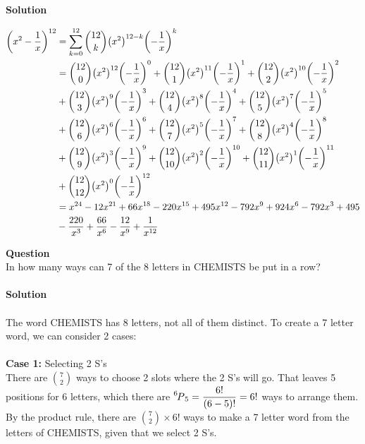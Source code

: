 \documentclass[article, 11pt]{article}
\newcounter{question}
\def\questionnum{{\Large\bfseries{Question \arabic{question} }}\\[1em]}
\newcommand{\question}{
    \stepcounter{question}
    \questionnum
}
\newcommand{\solution}{
    {{\large\bfseries{Solution}}}
}
\DeclarePairedDelimiter\paren{(}{)} %
\newcommand{\df}{\displaystyle\frac} %
\newcommand\perm[2][^n]{\prescript{#1\mkern-2.5mu}{}P_{#2}}
\begin{document}
\solution
\begin{align*}
    \paren*{x^2 - \frac{1}{x}}^{12} &= \sum_{k=0}^{12}\binom{12}{k}\paren*{x^2}^{12-k}\paren*{-\frac{1}{x}}^{k} \\
                                    &=\binom{12}{0}\paren*{x^2}^{12}\paren*{-\frac{1}{x}}^{0}+\binom{12}{1}\paren*{x^2}^{11}\paren*{-\frac{1}{x}}^{1}+\binom{12}{2}\paren*{x^2}^{10}\paren*{-\frac{1}{x}}^{2}  \\
                                    &+\binom{12}{3}\paren*{x^2}^{9}\paren*{-\frac{1}{x}}^{3}+\binom{12}{4}\paren*{x^2}^{8}\paren*{-\frac{1}{x}}^{4}+\binom{12}{5}\paren*{x^2}^{7}\paren*{-\frac{1}{x}}^{5}    \\
                                    &+\binom{12}{6}\paren*{x^2}^{6}\paren*{-\frac{1}{x}}^{6}+\binom{12}{7}\paren*{x^2}^{5}\paren*{-\frac{1}{x}}^{7}+\binom{12}{8}\paren*{x^2}^{4}\paren*{-\frac{1}{x}}^{8}     \\
                                    &+\binom{12}{9}\paren*{x^2}^{3}\paren*{-\frac{1}{x}}^{9}+\binom{12}{10}\paren*{x^2}^{2}\paren*{-\frac{1}{x}}^{10}+\binom{12}{11}\paren*{x^2}^{1}\paren*{-\frac{1}{x}}^{11} \\
                                    &+\binom{12}{12}\paren*{x^2}^{0}\paren*{-\frac{1}{x}}^{12}    \\ 
                                    &= x^{24}-12x^{21}+66x^{18}-220x^{15}+495x^{12}-792x^9+924x^6-792x^3+495 \\
                                    &-\frac{220}{x^3}+\frac{66}{x^6}-\frac{12}{x^9}+\frac{1}{x^{12}}
\end{align*}
\newpage
\question
In how many ways can 7 of the 8 letters in CHEMISTS be put in a row? \\
\\
\solution \\
\\
The word CHEMISTS has 8 letters, not all of them distinct. To create a 7 letter word, we can consider 2 cases: \\
\\
\textbf{Case 1:} Selecting 2 S's \\
There are $\displaystyle\binom{7}{2}$ ways to choose 2 slots where the 2 S's will go. That leaves 5 positions for 6 letters, which there are $\perm[6]{5}= \df{6!}{(6-5)!} = 6!$ ways to arrange them. By the product rule, there are $\displaystyle\binom{7}{2} \times 6!$ ways to make a 7 letter word from the letters of CHEMISTS, given that we select 2 S's.\\
\end{document}
